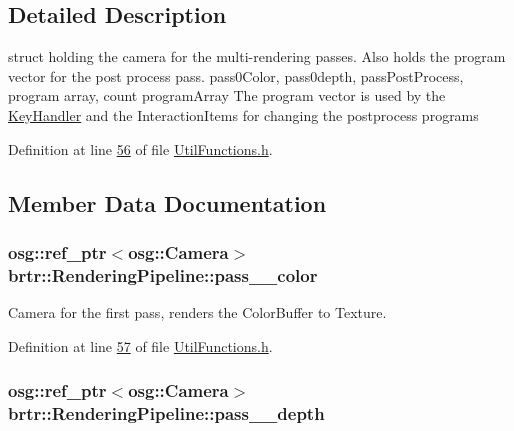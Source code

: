 \subsection{Detailed Description}
struct holding the camera for the multi-\/rendering passes. Also holds the program vector for the post process pass. pass0\+Color, pass0depth, pass\+Post\+Process, program array, count program\+Array The program vector is used by the \hyperlink{classbrtr_1_1_key_handler}{Key\+Handler} and the Interaction\+Items for changing the postprocess programs 

Definition at line \hyperlink{_util_functions_8h_source_l00056}{56} of file \hyperlink{_util_functions_8h_source}{Util\+Functions.\+h}.



\subsection{Member Data Documentation}
\hypertarget{structbrtr_1_1_rendering_pipeline_ae945030321a6b44f00266954c8c50bf3}{
\subsubsection[{pass\+\_\+0\+\_\+color}]{\setlength{\rightskip}{0pt plus 5cm}osg\+::ref\+\_\+ptr$<$osg\+::\+Camera$>$ brtr\+::\+Rendering\+Pipeline\+::pass\+\_\+\_\+color}}\label{structbrtr_1_1_rendering_pipeline_ae945030321a6b44f00266954c8c50bf3}


Camera for the first pass, renders the Color\+Buffer to Texture. 



Definition at line \hyperlink{_util_functions_8h_source_l00057}{57} of file \hyperlink{_util_functions_8h_source}{Util\+Functions.\+h}.

\hypertarget{structbrtr_1_1_rendering_pipeline_a18752632c1b557d283e523ebbc0443a0}{
\subsubsection[{pass\+\_\+0\+\_\+depth}]{\setlength{\rightskip}{0pt plus 5cm}osg\+::ref\+\_\+ptr$<$osg\+::\+Camera$>$ brtr\+::\+Rendering\+Pipeline\+::pass\+\_\+\_\+depth}}\label{structbrtr_1_1_rendering_pipeline_a18752632c1b557d283e523ebbc0443a0}



